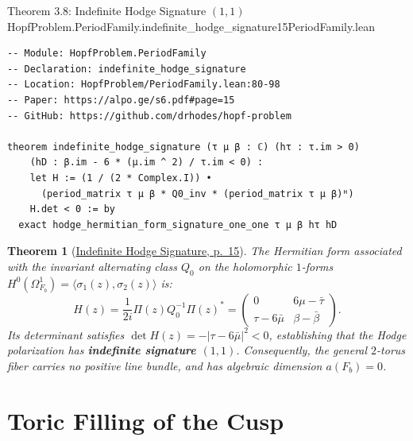 \documentclass[10pt]{article}
\newtheorem{theorem}{Theorem}[section]
\gdef\hashchar{#}
\newcommand{\paperref}[2]{\href{https://alpo.ge/s6.pdf\hashchar page=#1}{#2}}
\begin{document}
\begin{comparativeblock}{Theorem 3.8: Indefinite Hodge Signature $(1,1)$}{HopfProblem.PeriodFamily.indefinite_hodge_signature}{15}{PeriodFamily.lean}
\begin{verbatim}
-- Module: HopfProblem.PeriodFamily
-- Declaration: indefinite_hodge_signature
-- Location: HopfProblem/PeriodFamily.lean:80-98
-- Paper: https://alpo.ge/s6.pdf#page=15
-- GitHub: https://github.com/drhodes/hopf-problem

theorem indefinite_hodge_signature (τ μ β : ℂ) (hτ : τ.im > 0)
    (hD : β.im - 6 * (μ.im ^ 2) / τ.im < 0) :
    let H := (1 / (2 * Complex.I)) •
      (period_matrix τ μ β * Q0_inv * (period_matrix τ μ β)ᴴ)
    H.det < 0 := by
  exact hodge_hermitian_form_signature_one_one τ μ β hτ hD
\end{verbatim}
\tcblower
\begin{theorem}[\paperref{15}{Indefinite Hodge Signature, p.~15}]\label{thm:hodge-signature}
The Hermitian form associated with the invariant alternating class $Q_0$ on the holomorphic $1$-forms $H^0(\Omega_{F_b}^1) = \langle \sigma_1(z), \sigma_2(z) \rangle$ is:
\[
H(z) = \frac{1}{2i} \Pi(z) Q_0^{-1} \Pi(z)^* = \begin{pmatrix} 0 & 6\mu - \bar\tau \\ \tau - 6\bar\mu & \beta - \bar\beta \end{pmatrix}.
\]
Its determinant satisfies $\det H(z) = -|\tau - 6\bar\mu|^2 < 0$, establishing that the Hodge polarization has \textbf{indefinite signature $(1,1)$}.
Consequently, the general $2$-torus fiber carries no positive line bundle, and has algebraic dimension $a(F_b) = 0$.
\end{theorem}
\end{comparativeblock}

\newpage

\section{Toric Filling of the Cusp}
\end{document}
